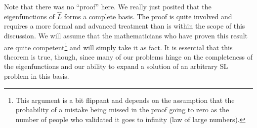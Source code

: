 Note that there was no ``proof'' here.
We really just posited that the eigenfunctions of $\hat{L}$ forms a complete basis.
The proof is quite involved and requires a more formal and advanced treatment than is within the scope of this discussion.
We will assume that the mathematicians who have proven this result are quite competent\footnote{This argument is a bit flippant and depends on the assumption that the probability of a mistake being missed in the proof going to zero as the number of people who validated it goes to infinity (law of large numbers).} and will simply take it as fact.
It is essential that this theorem is true, though, since many of our problems hinge on the completeness of the eigenfunctions and our ability to expand a solution of an arbitrary SL problem in this basis.







